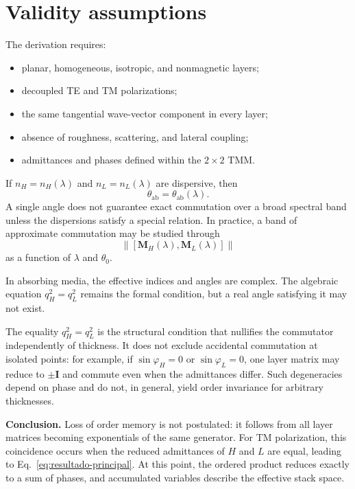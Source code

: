 \documentclass[10pt,a4paper]{article}
\newcommand{\M}{\mathbf{M}}
\newcommand{\I}{\mathbf{I}}
\newcommand{\comm}[2]{\left[#1,#2\right]}
\begin{document}
\section{Validity assumptions}

The derivation requires:
\begin{itemize}
\item planar, homogeneous, isotropic, and nonmagnetic layers;
\item decoupled TE and TM polarizations;
\item the same tangential wave-vector component in every layer;
\item absence of roughness, scattering, and lateral coupling;
\item admittances and phases defined within the $2\times2$ TMM.
\end{itemize}

If $n_H=n_H(\lambda)$ and $n_L=n_L(\lambda)$ are dispersive, then
\begin{equation}
\theta_{\mathrm{ab}}=\theta_{\mathrm{ab}}(\lambda).
\end{equation}
A single angle does not guarantee exact commutation over a broad spectral band unless the dispersions satisfy a special relation. In practice, a band of approximate commutation may be studied through
\begin{equation}
\left\|\comm{\M_H(\lambda)}{\M_L(\lambda)}\right\|
\end{equation}
as a function of $\lambda$ and $\theta_0$.

In absorbing media, the effective indices and angles are complex. The algebraic equation $q_H^2=q_L^2$ remains the formal condition, but a real angle satisfying it may not exist.

The equality $q_H^2=q_L^2$ is the structural condition that nullifies the commutator independently of thickness. It does not exclude accidental commutation at isolated points: for example, if $\sin\varphi_H=0$ or $\sin\varphi_L=0$, one layer matrix may reduce to $\pm\I$ and commute even when the admittances differ. Such degeneracies depend on phase and do not, in general, yield order invariance for arbitrary thicknesses.

\begin{resultbox}
\textbf{Conclusion.} Loss of order memory is not postulated: it follows from all layer matrices becoming exponentials of the same generator. For TM polarization, this coincidence occurs when the reduced admittances of $H$ and $L$ are equal, leading to Eq.~\eqref{eq:resultado-principal}. At this point, the ordered product reduces exactly to a sum of phases, and accumulated variables describe the effective stack space.
\end{resultbox}
\end{document}
